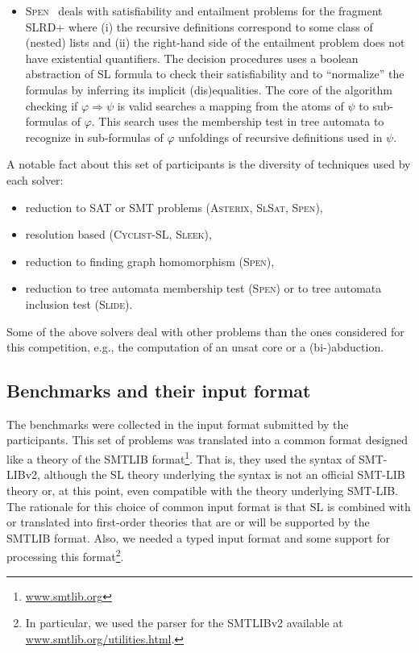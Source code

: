 \documentclass[twoside,11pt]{article}
\newcommand{\limp}{\Rightarrow}
\newcommand{\ASTERIX}{\textsc{Asterix}}
\newcommand{\CYCLIST}{\textsc{Cyclist-SL}}
\newcommand{\SLEEK}{\textsc{Sleek}}
\newcommand{\SLIDE}{\textsc{Slide}}
\newcommand{\SLSAT}{\textsc{SlSat}}
\newcommand{\SPEN}{\textsc{Spen}}
\begin{document}
\begin{itemize}
\item \SPEN~\cite{EneaLSV14,SPENsite} 
deals with satisfiability and entailment problems for the fragment SLRD+ where 
(i) the recursive definitions correspond to some class of (nested) lists
and (ii) the right-hand side of the entailment problem does not have existential quantifiers.
The decision procedures uses a boolean abstraction of SL formula to check their satisfiability and to ``normalize'' the formulas by inferring its implicit (dis)equalities. %
The core of the algorithm checking if $\varphi\limp\psi$ is valid searches a mapping from the atoms of $\psi$ to sub-formulas of $\varphi$.
This search uses the membership test in tree automata to recognize in sub-formulas of $\varphi$ unfoldings of recursive definitions used in $\psi$.

\end{itemize}

A notable fact about this set of participants is the diversity of techniques used by each solver:
\begin{itemize}
\item reduction to SAT or SMT problems (\ASTERIX, \SLSAT, \SPEN),
\item resolution based (\CYCLIST, \SLEEK),
\item reduction to finding graph homomorphism (\SPEN),
\item reduction to tree automata membership test (\SPEN) or to tree automata inclusion test (\SLIDE).
\end{itemize}

Some of the above solvers deal with other problems than the ones considered for this competition, e.g., the computation of an unsat core or a (bi-)abduction.


\subsection{Benchmarks and their input format}
The benchmarks were collected in the input format submitted by the participants.
This set of problems was translated into a common format designed like a theory of the SMTLIB format\footnote{\url{www.smtlib.org}}. That is, they used the syntax of SMT-LIBv2, although the SL theory underlying the syntax is not an official SMT-LIB theory or, at this point, even compatible with the theory underlying SMT-LIB.
The rationale for this choice of common input format is 
that SL is combined with or translated into first-order theories that are or will be supported by the SMTLIB format.
Also, we needed a typed input format and some support for processing this format\footnote{In particular, we used the parser for the SMTLIBv2 available at \url{www.smtlib.org/utilities.html}.}.
 
\end{document}
